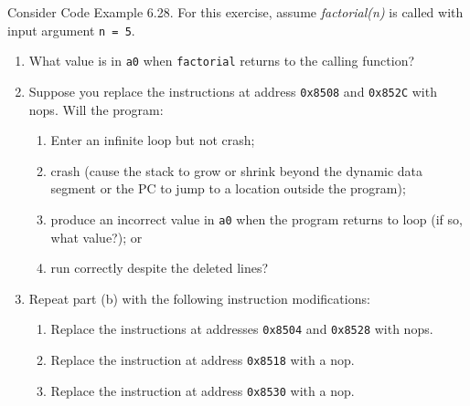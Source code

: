 \documentclass[12pt]{article}
\newenvironment{ex}[2][Exercise]{\begin{trivlist}
		\item[\hskip \labelsep {\bfseries #1}\hskip \labelsep {\bfseries #2.}]}{\end{trivlist}}
\begin{document}
\begin{ex}{6.20}
	Consider Code Example 6.28. For this exercise, assume \emph{factorial(n)}
	is called with input argument \texttt{n = 5}.
	\begin{enumerate}[label=(\alph*)]
		\item What value is in \texttt{a0} when \texttt{factorial} returns
		to the calling function?
		\item Suppose you replace the instructions at address \texttt{0x8508} and
		\texttt{0x852C} with nops. Will the program:
		\begin{enumerate}[label=(\arabic*)]
			\item Enter an infinite loop but not crash;
			\item crash (cause the stack to grow or shrink beyond the dynamic data
			segment or the PC to jump to a location outside the program);
			\item produce an incorrect value in \texttt{a0} when the program
			returns to loop (if so, what value?); or
			\item run correctly despite the deleted lines?
		\end{enumerate}
		\item Repeat part (b) with the following instruction modifications:
		\begin{enumerate}[label=(\arabic*)]
			\item Replace the instructions at addresses \texttt{0x8504} and 
			\texttt{0x8528} with nops.
			\item Replace the instruction at address \texttt{0x8518} with a nop.
			\item Replace the instruction at address \texttt{0x8530} with a nop.
		\end{enumerate}
	\end{enumerate}
\end{ex}
\end{document}
